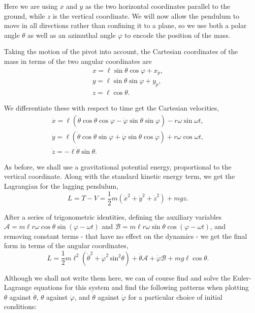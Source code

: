 \documentclass[11pt]{article}
\begin{document}
Here we are using $x$ and $y$ as the two horizontal coordinates parallel to the ground, while $z$ is the vertical coordinate. We will now allow the pendulum to move in all directions rather than confining it to a plane, so we use both a polar angle $\theta$ as well as an azimuthal angle $\varphi$ to encode the position of the mass.
\newpage

Taking the motion of the pivot into account, the Cartesian coordinates of the mass in terms of the two angular coordinates are
\begin{gather*}
x=\ell\sin\theta\cos\varphi+x_p,\\[4pt]
y=\ell\sin\theta\sin\varphi+y_p,\\[4pt]
z=\ell\cos\theta.
\end{gather*}

We differentiate these with respect to time get the Cartesian velocities,
\begin{gather*}
\dot{x}=\ell\left(\dot{\theta}\cos\theta\cos\varphi-\dot{\varphi}\sin\theta\sin\varphi\right)-r\omega\sin\omega t,\\[4pt]
\dot{y}=\ell\left(\dot{\theta}\cos\theta\sin\varphi+\dot{\varphi}\sin\theta\cos\varphi\right)+r\omega\cos\omega t,\\[4pt]
\dot{z}=-\ell\dot{\theta}\sin\theta.
\end{gather*}

As before, we shall use a gravitational potential energy, proportional to the vertical coordinate. Along with the standard kinetic energy term, we get the Lagrangian for the lagging pendulum,
$$L=T-V=\frac{1}{2}m\left(\dot{x}^2+\dot{y}^2+\dot{z}^2\right)+mgz.$$

After a series of trigonometric identities, defining the auxiliary variables $\mathcal{A}=m\ell r\omega\cos\theta\sin(\varphi-\omega t)$ and $\mathcal{B}=m\ell r\omega\sin\theta\cos(\varphi-\omega t)$, and removing constant terms \hyp{} that have no effect on the dynamics \hyp{} we get the final form in terms of the angular coordinates,
$$L=\frac{1}{2}m\ell^2\left(\dot{\theta}^2+\dot{\varphi}^2\,\text{sin}{}^2\theta\right)+\dot{\theta}\mathcal{A}+\dot{\varphi}\mathcal{B}+mg\ell\cos\theta.$$

Although we shall not write them here, we can of course find and solve the Euler\hyp{}Lagrange equations for this system and find the following patterns when plotting $\theta$ against $\dot{\theta}$, $\theta$ against $\dot{\varphi}$, and $\dot{\theta}$ against $\dot{\varphi}$ for a particular choice of initial conditions:
\newpage
\end{document}
